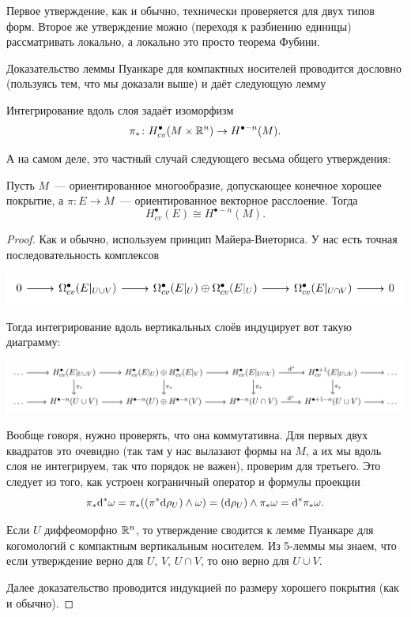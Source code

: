  	 	Первое утверждение, как и обычно, технически проверяется для двух типов форм. Второе же утверждение можно (переходя к разбиению единицы) рассматривать локально, а локально это просто теорема Фубини. 


 	 	Доказательство леммы Пуанкаре для компактных носителей проводится дословно (пользуясь тем, что мы доказали выше) и даёт следующую лемму

 	 	\begin{lemma} 
 	 		Интегрирование вдоль слоя задаёт изоморфизм 
 	 		\[
 	 			\pi_*\colon H^{\bullet}_{cv}(M \times \R^n) \to H^{\bullet - n}(M).
 	 		\]
 	 	\end{lemma}

 	 	А на самом деле, это частный случай следующего весьма общего утверждения: 

 	 	\begin{theorem} 
 	 		Пусть $M$~--- ориентированное многообразие, допускающее конечное хорошее покрытие, а $\pi\colon E \to M$~--- ориентированное векторное расслоение. Тогда 
 	 		\[
 	 			H^{\bullet}_{cv}(E) \cong H^{\bullet - n}(M).
 	 		\]
 	 	\end{theorem}
 	 	\begin{proof}
 	 		Как и обычно, используем принцип Майера-Виеториса. У нас есть точная последовательность комплексов
 	 		\begin{center}	
 	 			\includegraphics{lectures/7/pictures/cd_27.pdf}
 	 		\end{center}
 	 		Тогда интегрирование вдоль вертикальных слоёв индуцирует вот такую диаграмму:
 	 		\begin{center}
 	 			\includegraphics{lectures/7/pictures/cd_28.pdf}
 	 		\end{center}

 	 		Вообще говоря, нужно проверять, что она коммутативна. Для первых двух квадратов это очевидно (так там у нас вылазают формы на $M$, а их мы вдоль слоя не интегрируем, так что порядок не важен), проверим для третьего. Это следует из того, как устроен кограничный оператор и формулы проекции 
 	 		\[
 	 			\pi_* \mathrm{d}^* \omega = \pi_*((\pi^* \mathrm{d}\rho_U) \wedge \omega) = \lr*{\mathrm{d}\rho_U } \wedge \pi_* \omega = \mathrm{d}^* \pi_* \omega. 
 	 		\]

 	 		Если $U$ диффеоморфно $\R^n$, то утверждение сводится к лемме Пуанкаре для когомологий с компактным вертикальным носителем. Из 5-леммы мы знаем, что если утверждение верно для $U$,  $V$, $U \cap V$, то оно верно для $U \cup V$. 

 	 		Далее доказательство проводится индукцией по размеру хорошего покрытия (как и обычно). 
 	 	\end{proof}

